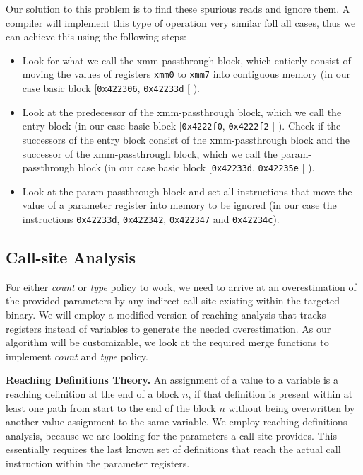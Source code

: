 Our solution to this problem is to find these spurious reads and ignore them. A compiler will implement this type of operation very 
similar foll all cases, thus we can achieve this using the following steps:
\begin{itemize}
\item Look for what we call the xmm-passthrough block, which entierly consist of moving the values of registers \texttt{xmm0} to 
\texttt{xmm7} into contiguous memory (in our case basic block [\texttt{0x422306}, \texttt{0x42233d} [ ).
\item Look at the predecessor of the xmm-passthrough block, which we call the entry block (in our case basic block [\texttt{0x4222f0},
\texttt{0x4222f2} [ ). Check if the successors of the entry block consist of the xmm-passthrough block and the successor of the 
xmm-passthrough block, which we call the param-passthrough block (in our case basic block [\texttt{0x42233d}, \texttt{0x42235e} [ ).
\item Look at the param-passthrough block and set all instructions that move the value of a parameter register into memory to be
ignored (in our case the instructions \texttt{0x42233d}, \texttt{0x422342}, \texttt{0x422347} and \texttt{0x42234c}).
\end{itemize}


\subsection{Call-site Analysis}
\label{section:callsiteanalysis}
For either \emph{count} or \emph{type} policy to work, we need to arrive at an overestimation of the provided parameters by any indirect 
call-site existing within the targeted binary. We will employ a modified version of reaching analysis that tracks registers instead of 
variables to generate the needed overestimation. As our algorithm will be customizable, we look at the required merge functions to 
implement \emph{count} and \emph{type} policy. 

\textbf{Reaching Definitions Theory.}
\label{subsection:reachindefinitionstheory}
An assignment of a value to a variable is a reaching definition at the end of a block $n$, if that definition is present within at 
least one path from start to the end of the block $n$ without being overwritten by another value assignment to the same variable. 
We employ reaching definitions analysis, because we are looking for the parameters a call-site provides. This essentially 
requires the last known set of definitions that reach the actual call instruction within the parameter registers.

